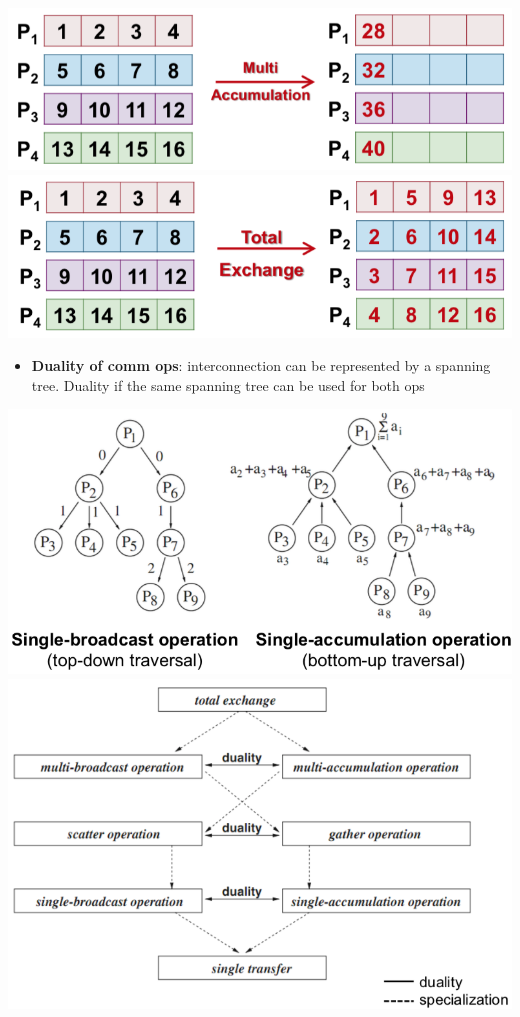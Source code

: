 \documentclass[10pt,landscape,a4paper]{article}
\begin{document}
\begin{multicols*}{4}
  \includegraphics[width=0.33\linewidth]{multiaccu}
  \includegraphics[width=0.33\linewidth]{totalexch}
  \begin{itemize}
    \item \textbf{Duality of comm ops}: interconnection can be represented by a spanning tree. Duality if the same spanning tree can be used for both ops
  \end{itemize}
  \includegraphics[width=0.5\linewidth]{duality1}
  \includegraphics[width=0.5\linewidth]{duality2}

\end{multicols*}
\end{document}
